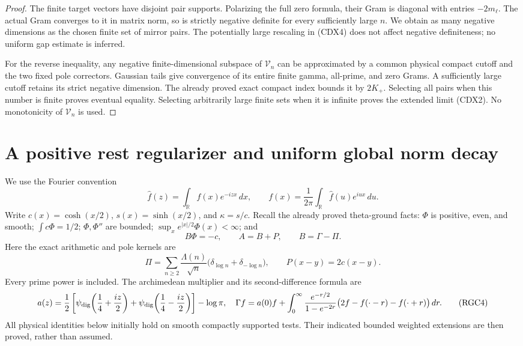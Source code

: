 \documentclass[11pt]{article}
\theoremstyle{remark}\newtheorem{remark}[theorem]{Remark}
\begin{document}
\begin{proof}
The finite target vectors have disjoint pair supports.
Polarizing the full zero formula, their Gram is diagonal
with entries $-2m_\ell$. The actual Gram converges to it
in matrix norm, so is strictly negative definite for
every sufficiently large $n$. We obtain as many negative
dimensions as the chosen finite set of mirror pairs.
The potentially large rescaling in (CDX4) does not affect
negative definiteness; no uniform gap estimate is inferred.

For the reverse inequality, any negative finite-dimensional
subspace of $\mathcal V_n$ can be approximated by a common
physical compact cutoff and the two fixed pole correctors.
Gaussian tails give convergence of its entire finite
gamma, all-prime, and zero Grams. A sufficiently large
cutoff retains its strict negative dimension.
The already proved exact compact index bounds it by $2K_+$.
Selecting all pairs when this number is finite proves
eventual equality. Selecting arbitrarily large finite sets
when it is infinite proves the extended limit (CDX2).
No monotonicity of $\mathcal V_n$ is used.
\end{proof}

\section{A positive rest regularizer and uniform global norm decay}
\label{sec:rest-regularizer-global}

We use the Fourier convention
\[
 \widehat f(z)=\int_{\mathbb R}f(x)e^{-izx}\,dx,
 \qquad f(x)=\frac1{2\pi}\int_{\mathbb R}\widehat f(u)e^{iux}\,du.
 \tag{RGC1}
\]
Write \(c(x)=\cosh(x/2)\), \(s(x)=\sinh(x/2)\), and
\(\kappa=s/c\). Recall the already proved theta-ground facts:
\(\Phi\) is positive, even, and smooth;
\(\int c\Phi=1/2\); \(\Phi,\Phi''\) are bounded;
\(\sup_x e^{|x|/2}\Phi(x)<\infty\); and
\[
 B\Phi=-c,\qquad A=B+P,\qquad B=\Gamma-\Pi.
 \tag{RGC2}
\]
Here the exact arithmetic and pole kernels are
\[
 \Pi=\sum_{n\ge2}\frac{\Lambda(n)}{\sqrt n}
       \bigl(\delta_{\log n}+\delta_{-\log n}\bigr),
 \qquad P(x-y)=2c(x-y).
 \tag{RGC3}
\]
Every prime power is included. The archimedean multiplier and its
second-difference formula are
\[
 a(z)=\frac12\left[
 \psi_{\rm dig}\!\left(\frac14+\frac{iz}{2}\right)+
 \psi_{\rm dig}\!\left(\frac14-\frac{iz}{2}\right)\right]-\log\pi,
 \quad
 \Gamma f=a(0)f+\int_0^\infty
 \frac{e^{-r/2}}{1-e^{-2r}}
 \bigl(2f-f(\cdot-r)-f(\cdot+r)\bigr)\,dr.
 \tag{RGC4}
\]
All physical identities below initially hold on smooth compactly
supported tests. Their indicated bounded weighted extensions are
then proved, rather than assumed.
\end{document}
